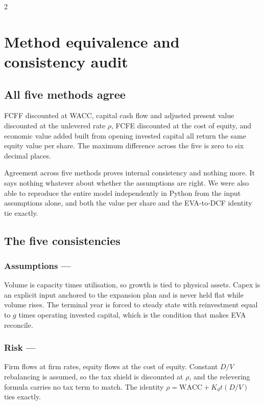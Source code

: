 \begin{paracol}{2}
\switchcolumn*
\section{Method equivalence and consistency audit}

\subsection{All five methods agree}

FCFF discounted at WACC, capital cash flow and adjusted present value discounted at
the unlevered rate $\rho$, FCFE discounted at the cost of equity, and economic value
added built from opening invested capital all return the same equity value per share.
The maximum difference across the five is zero to six decimal places.

\begin{okbox}
Agreement across five methods proves internal consistency and nothing more. It says
nothing whatever about whether the assumptions are right. We were also able to
reproduce the entire model independently in Python from the input assumptions alone,
and both the value per share and the EVA-to-DCF identity tie exactly.
\end{okbox}

\subsection{The five consistencies}

\subsubsection{Assumptions --- \PASS} Volume is capacity times utilisation, so
growth is tied to physical assets. Capex is an explicit input anchored to the
expansion plan and is never held flat while volume rises. The terminal year is forced
to steady state with reinvestment equal to $g$ times operating invested capital,
which is the condition that makes EVA reconcile.

\subsubsection{Risk --- \PASS} Firm flows at firm rates, equity flows at the cost of
equity. Constant $D/V$ rebalancing is assumed, so the tax shield is discounted at
$\rho$, and the relevering formula carries no tax term to match. The identity $\rho =
\text{WACC} + K_d t (D/V)$ ties exactly.


\end{paracol}
